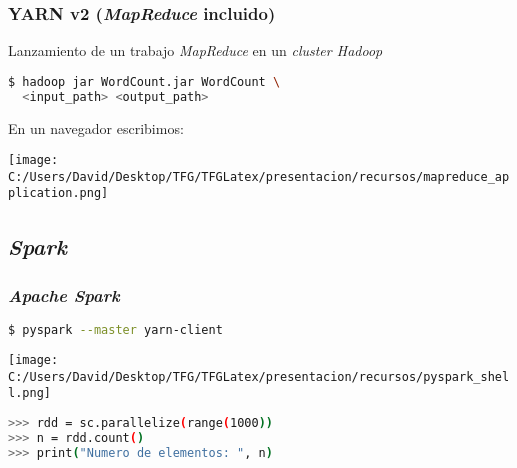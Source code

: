 \documentclass{beamer}
\begin{document}

\begin{frame}[fragile]
\frametitle{YARN v2 (\textit{MapReduce} incluido)}
Lanzamiento de un trabajo \textit{MapReduce} en un \textit{cluster Hadoop}
\begin{lstlisting}[language=bash, numbers=none, frame=single]
$ hadoop jar WordCount.jar WordCount \
  <input_path> <output_path>
\end{lstlisting}
  
En un navegador escribimos: \\
\vfill
  
\texttt{[image: C:/Users/David/Desktop/TFG/TFGLatex/presentacion/recursos/mapreduce\_application.png]}
  
\end{frame}

\subsection{\textit{Spark}}

\begin{frame}[fragile]
\frametitle{\textit{Apache Spark}}

\begin{block}{}
\begin{lstlisting}[language=bash, numbers=none, frame=single]
$ pyspark --master yarn-client
\end{lstlisting}
\end{block}

\texttt{[image: C:/Users/David/Desktop/TFG/TFGLatex/presentacion/recursos/pyspark\_shell.png]}

\begin{block}{}
\begin{lstlisting}[language=bash, numbers=none, frame=single, showstringspaces=false]
>>> rdd = sc.parallelize(range(1000))
>>> n = rdd.count()
>>> print("Numero de elementos: ", n)
\end{lstlisting}
\end{block}

\end{frame}

\end{document}
